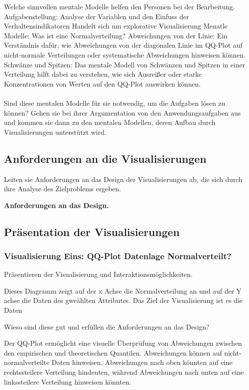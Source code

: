 \documentclass[usegeometry=true]{scrartcl}
\begin{document}
Welche sinnvollen mentale Modelle helfen den Personen bei der Bearbeitung. 
Aufgabenstellung: Analyse der Variablen und den Einfuss der Verhaltensindikatoren
Handelt sich um explorative Visualisierung 
Menatle Modelle: Was ist eine Normalverteilung? 
Abweichungen von der Linie:
  Ein Verständnis dafür, wie Abweichungen von der diagonalen Linie im QQ-Plot auf nicht-normale Verteilungen oder systematische Abweichungen hinweisen können.
  Schwänze und Spitzen:
Das mentale Modell von Schwänzen und Spitzen in einer Verteilung hilft dabei zu verstehen, wie sich Ausreißer oder starke Konzentrationen von Werten auf den QQ-Plot auswirken können.
\\
\\

Sind diese mentalen Modelle für sie notwendig, um die Aufgaben lösen zu können? 
Gehen sie bei ihrer Argumentation von den Anwendungsaufgaben aus und kommen sie dann zu den mentalen Modellen, deren Aufbau durch Visualisierungen unterstützt wird. 
\subsection{Anforderungen an die Visualisierungen}
Leiten sie Anforderungen an das Design der Visualisierungen ab, die sich durch ihre Analyse des Zielproblems ergeben.

\textbf{ Anforderungen an das Design. }
\subsection{Präsentation der Visualisierungen}

\subsubsection{Visualisierung Eins: QQ-Plot Datenlage Normalverteilt?}

Präsentieren der Visualisierung und Interaktionsmöglichkeiten. 



Dieses Diagramm zeigt auf der x Achse die Normalverteilung an und auf der Y achse die Daten des gweählten Attributes.
Das Ziel der Visualisierung ist es die Daten

Wieso sind diese gut und erfüllen die Anforderungen an das Design?

 Der QQ-Plot ermöglicht eine visuelle Überprüfung von Abweichungen zwischen den empirischen
 und theoretischen Quantilen. Abweichungen können auf nicht-normalverteilte Daten hinweisen.
 Abweichungen nach oben könnten auf eine rechtssteilere Verteilung hindeuten, während Abweichungen 
 nach unten auf eine linkssteilere Verteilung hinweisen könnten.
\end{document}
